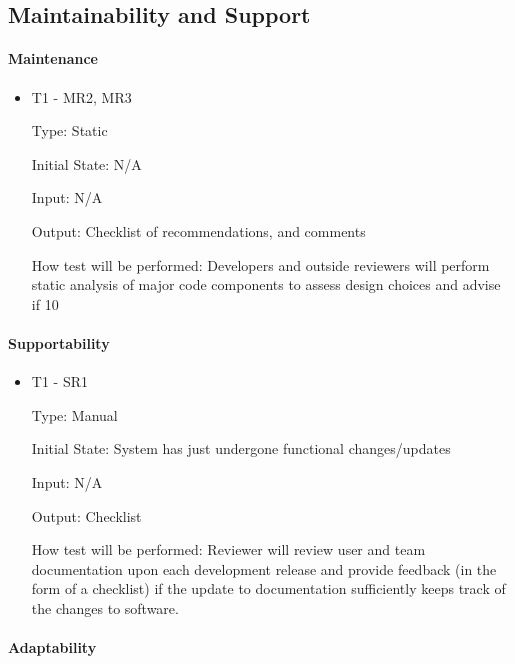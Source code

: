 \documentclass[12pt, titlepage]{article}
\begin{document}
\subsection{Maintainability and Support}

\paragraph{Maintenance}

\begin{itemize}

\item{T1 - MR2, MR3\\}

Type: Static

Initial State: N/A

Input: N/A

Output: Checklist of recommendations, and comments

How test will be performed: Developers and outside reviewers will perform static analysis of major code components to assess design choices and advise if 10%

\end{itemize}

\paragraph{Supportability}

\begin{itemize}

\item{T1 - SR1\\}

Type: Manual

Initial State: System has just undergone functional changes/updates

Input: N/A

Output: Checklist

How test will be performed: Reviewer will review user and team documentation upon each development release and provide feedback (in the form of a checklist) if the update to documentation sufficiently keeps track of the changes to software.

\end{itemize}

\paragraph{Adaptability}
\end{document}
